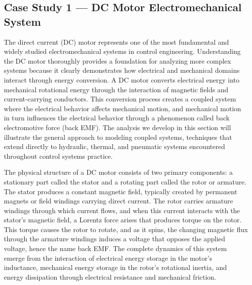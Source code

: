 \subsection{Case Study 1 --- DC Motor Electromechanical System}

The direct current (DC) motor represents one of the most fundamental and widely studied electromechanical systems in control engineering. Understanding the DC motor thoroughly provides a foundation for analyzing more complex systems because it clearly demonstrates how electrical and mechanical domains interact through energy conversion. A DC motor converts electrical energy into mechanical rotational energy through the interaction of magnetic fields and current-carrying conductors. This conversion process creates a coupled system where the electrical behavior affects mechanical motion, and mechanical motion in turn influences the electrical behavior through a phenomenon called back electromotive force (back EMF). The analysis we develop in this section will illustrate the general approach to modeling coupled systems, techniques that extend directly to hydraulic, thermal, and pneumatic systems encountered throughout control systems practice.

The physical structure of a DC motor consists of two primary components: a stationary part called the stator and a rotating part called the rotor or armature. The stator produces a constant magnetic field, typically created by permanent magnets or field windings carrying direct current. The rotor carries armature windings through which current flows, and when this current interacts with the stator's magnetic field, a Lorentz force arises that produces torque on the rotor. This torque causes the rotor to rotate, and as it spins, the changing magnetic flux through the armature windings induces a voltage that opposes the applied voltage, hence the name back EMF. The complete dynamics of this system emerge from the interaction of electrical energy storage in the motor's inductance, mechanical energy storage in the rotor's rotational inertia, and energy dissipation through electrical resistance and mechanical friction.

